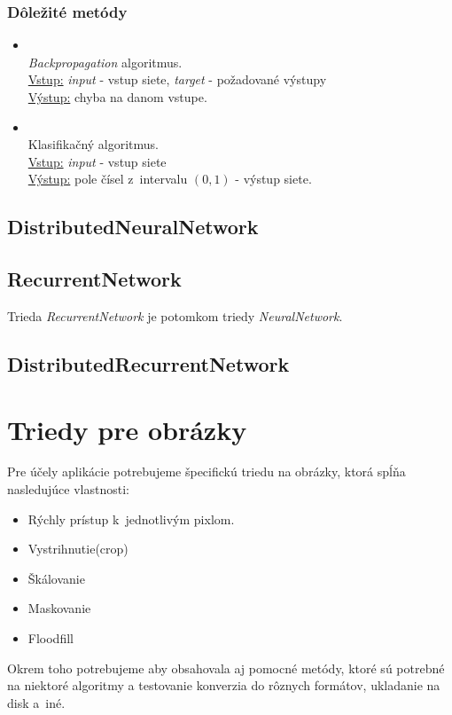 \subsubsection{Dôležité metódy}
\begin{itemize}
\item {}
\\\textit{Backpropagation} algoritmus.
\\ \underline{Vstup:} \textit{input} - vstup siete, \textit{target} - požadované výstupy 
\\ \underline{Výstup:} chyba na danom vstupe.
\item {}
\\ Klasifikačný algoritmus.
\\ \underline{Vstup:} \textit{input} - vstup siete
\\ \underline{Výstup:} pole čísel z~intervalu $(0,1)$ - výstup siete.
\end{itemize}

\subsection{DistributedNeuralNetwork}
\todo

\subsection{RecurrentNetwork}
Trieda \textit{RecurrentNetwork} je potomkom triedy \textit{NeuralNetwork}. %
\todo

\subsection{DistributedRecurrentNetwork}
\todo

\section{Triedy pre obrázky}

Pre účely aplikácie potrebujeme špecifickú triedu na obrázky, ktorá spĺňa nasledujúce vlastnosti:
\begin{itemize}
\item Rýchly prístup k~jednotlivým pixlom.
\item Vystrihnutie(crop)
\item Škálovanie
\item Maskovanie
\item Floodfill
\end{itemize}
Okrem toho potrebujeme aby obsahovala aj pomocné metódy, ktoré sú potrebné na niektoré algoritmy a testovanie konverzia do rôznych formátov, ukladanie na disk a~iné.

